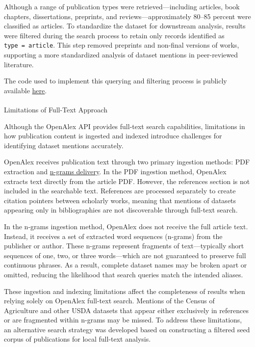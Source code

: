 \documentclass[
  letterpaper,
  DIV=11,
  numbers=noendperiod]{scrartcl}
\makeatletter
\let\oldparagraph\paragraph
\renewcommand{\paragraph}{
    \@ifstar
      \xxxParagraphStar
      \xxxParagraphNoStar
  }
\newcommand{\xxxParagraphStar}[1]{\oldparagraph*{#1}\mbox{}}
\newcommand{\xxxParagraphNoStar}[1]{\oldparagraph{#1}\mbox{}}
\makeatother
\begin{document}
Although a range of publication types were retrieved---including
articles, book chapters, dissertations, preprints, and
reviews---approximately 80--85 percent were classified as articles. To
standardize the dataset for downstream analysis, results were filtered
during the search process to retain only records identified as
\texttt{type\ =\ article}. This step removed preprints and non-final
versions of works, supporting a more standardized analysis of dataset
mentions in peer-reviewed literature.

The code used to implement this querying and filtering process is
publicly available
\href{https://github.com/laurenchenarides/compare_scopus_openalex_report}{here}.

\paragraph{Limitations of Full-Text
Approach}\label{limitations-of-full-text-approach}

Although the OpenAlex API provides full-text search capabilities,
limitations in how publication content is ingested and indexed introduce
challenges for identifying dataset mentions accurately.

OpenAlex receives publication text through two primary ingestion
methods: PDF extraction and
\href{https://docs.openalex.org/api-entities/works/get-n-grams}{n-grams
delivery}. In the PDF ingestion method, OpenAlex extracts text directly
from the article PDF. However, the references section is not included in
the searchable text. References are processed separately to create
citation pointers between scholarly works, meaning that mentions of
datasets appearing only in bibliographies are not discoverable through
full-text search.

In the n-grams ingestion method, OpenAlex does not receive the full
article text. Instead, it receives a set of extracted word sequences
(n-grams) from the publisher or author. These n-grams represent
fragments of text---typically short sequences of one, two, or three
words---which are not guaranteed to preserve full continuous phrases. As
a result, complete dataset names may be broken apart or omitted,
reducing the likelihood that search queries match the intended aliases.

These ingestion and indexing limitations affect the completeness of
results when relying solely on OpenAlex full-text search. Mentions of
the Census of Agriculture and other USDA datasets that appear either
exclusively in references or are fragmented within n-grams may be
missed. To address these limitations, an alternative search strategy was
developed based on constructing a filtered seed corpus of publications
for local full-text analysis.
\end{document}
